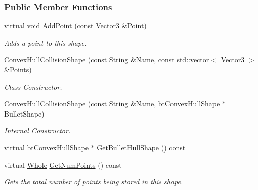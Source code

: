 \subsubsection*{Public Member Functions}
\begin{DoxyCompactItemize}
\item 
virtual void \hyperlink{classMezzanine_1_1ConvexHullCollisionShape_a6e6f3da8515bfd2b1d33563e86f3ed1e}{AddPoint} (const \hyperlink{classMezzanine_1_1Vector3}{Vector3} \&Point)
\begin{DoxyCompactList}\small\item\em Adds a point to this shape. \item\end{DoxyCompactList}\item 
\hyperlink{classMezzanine_1_1ConvexHullCollisionShape_a73119a35d5ba1e5cfebde7d58f894889}{ConvexHullCollisionShape} (const \hyperlink{namespaceMezzanine_acf9fcc130e6ebf08e3d8491aebcf1c86}{String} \&\hyperlink{classMezzanine_1_1CollisionShape_aac524c5c56fa4d158bc071f8aecfbe79}{Name}, const std::vector$<$ \hyperlink{classMezzanine_1_1Vector3}{Vector3} $>$ \&Points)
\begin{DoxyCompactList}\small\item\em Class Constructor. \item\end{DoxyCompactList}\item 
\hyperlink{classMezzanine_1_1ConvexHullCollisionShape_a100c6b3009ad46976a0484446a3d5da2}{ConvexHullCollisionShape} (const \hyperlink{namespaceMezzanine_acf9fcc130e6ebf08e3d8491aebcf1c86}{String} \&\hyperlink{classMezzanine_1_1CollisionShape_aac524c5c56fa4d158bc071f8aecfbe79}{Name}, btConvexHullShape $\ast$BulletShape)
\begin{DoxyCompactList}\small\item\em Internal Constructor. \item\end{DoxyCompactList}\item 
virtual btConvexHullShape $\ast$ \hyperlink{classMezzanine_1_1ConvexHullCollisionShape_a35acc9fd0c3e990bcacf1caf6d65a094}{GetBulletHullShape} () const 
\item 
virtual \hyperlink{namespaceMezzanine_adcbb6ce6d1eb4379d109e51171e2e493}{Whole} \hyperlink{classMezzanine_1_1ConvexHullCollisionShape_a8eaf9dccce90a9366d37ab9112bc0f22}{GetNumPoints} () const 
\begin{DoxyCompactList}\small\item\em Gets the total number of points being stored in this shape. \item\end{DoxyCompactList}\item 

\end{DoxyCompactItemize}
